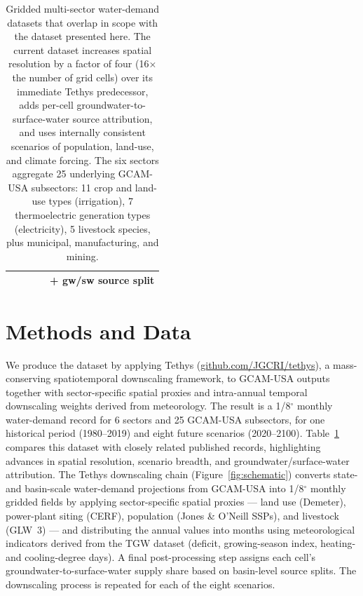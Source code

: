 \documentclass[fleqn,10pt]{wlscirep}
\begin{document}
\begin{table}[!ht]
\begin{tabular}{lllll}
                                               &                                &               &                  & \textbf{+ gw/sw source split} \\
\bottomrule
\end{tabular}
\caption{Gridded multi-sector water-demand datasets that overlap in scope with the dataset presented here. The current dataset increases spatial resolution by a factor of four (16$\times$ the number of grid cells) over its immediate Tethys predecessor\cite{Khan2023}, adds per-cell groundwater-to-surface-water source attribution, and uses internally consistent scenarios of population, land-use, and climate forcing. The six sectors aggregate 25 underlying GCAM-USA subsectors: 11 crop and land-use types (irrigation), 7 thermoelectric generation types (electricity), 5 livestock species, plus municipal, manufacturing, and mining.}
\label{tab:prior-datasets}
\end{table}

\section*{Methods and Data}
We produce the dataset by applying Tethys\cite{niazi_2026_20552731} (\href{https://github.com/JGCRI/tethys}{github.com/JGCRI/tethys}), a mass-conserving spatiotemporal downscaling framework, to GCAM-USA outputs together with sector-specific spatial proxies and intra-annual temporal downscaling weights derived from meteorology. The result is a 1/8$^{\circ}$ monthly water-demand record for 6 sectors and 25 GCAM-USA subsectors, for one historical period (1980--2019) and eight future scenarios (2020--2100). Table~\ref{tab:prior-datasets} compares this dataset with closely related published records, highlighting advances in spatial resolution, scenario breadth, and groundwater/surface-water attribution. The Tethys downscaling chain (Figure~\ref{fig:schematic}) converts state- and basin-scale water-demand projections from GCAM-USA\cite{Zhao_gcamusa_water,Zhao2024,Calvin2019GCAM,Binsted_2022} into 1/8$^{\circ}$ monthly gridded fields by applying sector-specific spatial proxies --- land use (Demeter\cite{Vernon-2018}), power-plant siting (CERF\cite{Zhao2024,Mongird2025CERF}), population (Jones \& O'Neill SSPs\cite{Jones_2016}), and livestock (GLW~3\cite{Gilbert2018}) --- and distributing the annual values into months using meteorological indicators derived from the TGW\cite{Jones2023TGW} dataset (deficit, growing-season index, heating- and cooling-degree days). A final post-processing step assigns each cell's groundwater-to-surface-water supply share based on basin-level source splits. The downscaling process is repeated for each of the eight scenarios.
\end{document}
